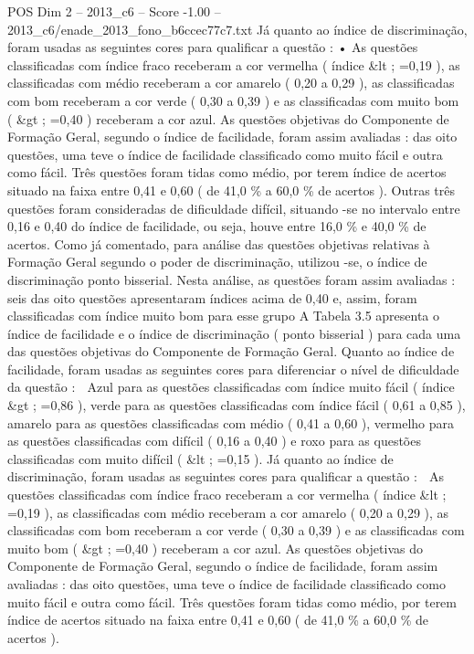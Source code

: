 \begin{textsample}{POS Dim 2 – 2013\_c6 – Score -1.00 – 2013\_c6/enade\_2013\_fono\_b6ccec77c7.txt}
Já quanto ao índice de discriminação, foram usadas as seguintes cores para qualificar a questão : • As questões classificadas com índice fraco receberam a cor vermelha ( índice \&lt ; =0,19 ), as classificadas com médio receberam a cor amarelo ( 0,20 a 0,29 ), as classificadas com bom receberam a cor verde ( 0,30 a 0,39 ) e as classificadas com muito bom ( \&gt ; =0,40 ) receberam a cor azul.
As questões objetivas do Componente de Formação Geral, segundo o índice de facilidade, foram assim avaliadas : das oito questões, uma teve o índice de facilidade classificado como muito fácil e outra como fácil.
Três questões foram tidas como médio, por terem índice de acertos situado na faixa entre 0,41 e 0,60 ( de 41,0 \% a 60,0 \% de acertos ).
Outras três questões foram consideradas de dificuldade difícil, situando -se no intervalo entre 0,16 e 0,40 do índice de facilidade, ou seja, houve entre 16,0 \% e 40,0 \% de acertos.
Como já comentado, para análise das questões objetivas relativas à Formação Geral segundo o poder de discriminação, utilizou -se, o índice de discriminação ponto bisserial.
Nesta análise, as questões foram assim avaliadas : seis das oito questões apresentaram índices acima de 0,40 e, assim, foram classificadas com índice muito bom para esse grupo A Tabela 3.5 apresenta o índice de facilidade e o índice de discriminação ( ponto bisserial ) para cada uma das questões objetivas do Componente de Formação Geral.
Quanto ao índice de facilidade, foram usadas as seguintes cores para diferenciar o nível de dificuldade da questão :  Azul para as questões classificadas com índice muito fácil ( índice \&gt ; =0,86 ), verde para as questões classificadas com índice fácil ( 0,61 a 0,85 ), amarelo para as questões classificadas com médio ( 0,41 a 0,60 ), vermelho para as questões classificadas com difícil ( 0,16 a 0,40 ) e roxo para as questões classificadas com muito difícil ( \&lt ; =0,15 ).
Já quanto ao índice de discriminação, foram usadas as seguintes cores para qualificar a questão :  As questões classificadas com índice fraco receberam a cor vermelha ( índice \&lt ; =0,19 ), as classificadas com médio receberam a cor amarelo ( 0,20 a 0,29 ), as classificadas com bom receberam a cor verde ( 0,30 a 0,39 ) e as classificadas com muito bom ( \&gt ; =0,40 ) receberam a cor azul.
As questões objetivas do Componente de Formação Geral, segundo o índice de facilidade, foram assim avaliadas : das oito questões, uma teve o índice de facilidade classificado como muito fácil e outra como fácil.
Três questões foram tidas como médio, por terem índice de acertos situado na faixa entre 0,41 e 0,60 ( de 41,0 \% a 60,0 \% de acertos ).

\end{textsample}
